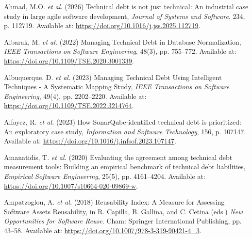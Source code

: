 \documentclass[
  12pt,
  letterpaper,
  12pt,
  oneside,
  english,
  onehalfspacing,
  headsepline]{MastersDoctoralThesis}
\newlength{\cslhangindent}
\newenvironment{CSLReferences}[2] %
 {\begin{list}{}{%
  \setlength{\itemindent}{0pt}
  \setlength{\leftmargin}{0pt}
  \setlength{\parsep}{0pt}
  \ifodd #1
   \setlength{\leftmargin}{\cslhangindent}
   \setlength{\itemindent}{-1\cslhangindent}
  \fi
  \setlength{\itemsep}{#2\baselineskip}}}
 {\end{list}}
\begin{document}

\label{refs}
\begin{CSLReferences}{0}{1}
Ahmad, M.O. \emph{et al.} (2026) \textquotesingle Technical debt is not
just technical: {An} industrial case study in large agile software
development\textquotesingle, \emph{Journal of Systems and Software},
234, p. 112719. Available at:
\url{https://doi.org/10.1016/j.jss.2025.112719}.

Albarak, M. \emph{et al.} (2022) \textquotesingle Managing {Technical
Debt} in {Database Normalization}\textquotesingle, \emph{IEEE
Transactions on Software Engineering}, 48(3), pp. 755--772. Available
at: \url{https://doi.org/10.1109/TSE.2020.3001339}.

Albuquerque, D. \emph{et al.} (2023) \textquotesingle Managing
{Technical Debt Using Intelligent Techniques} - {A Systematic Mapping
Study}\textquotesingle, \emph{IEEE Transactions on Software
Engineering}, 49(4), pp. 2202--2220. Available at:
\url{https://doi.org/10.1109/TSE.2022.3214764}.

Alfayez, R. \emph{et al.} (2023) \textquotesingle How
{SonarQube-identified} technical debt is prioritized: {An} exploratory
case study\textquotesingle, \emph{Information and Software Technology},
156, p. 107147. Available at:
\url{https://doi.org/10.1016/j.infsof.2023.107147}.

Amanatidis, T. \emph{et al.} (2020) \textquotesingle Evaluating the
agreement among technical debt measurement tools: Building an empirical
benchmark of technical debt liabilities\textquotesingle, \emph{Empirical
Software Engineering}, 25(5), pp. 4161--4204. Available at:
\url{https://doi.org/10.1007/s10664-020-09869-w}.

Ampatzoglou, A. \emph{et al.} (2018) \textquotesingle Reusability
{Index}: {A Measure} for {Assessing Software Assets
Reusability}\textquotesingle, in R. Capilla, B. Gallina, and C. Cetina
(eds.) \emph{New {Opportunities} for {Software Reuse}}. Cham: Springer
International Publishing, pp. 43--58. Available at:
\url{https://doi.org/10.1007/978-3-319-90421-4_3}.


\end{CSLReferences}
\end{document}
